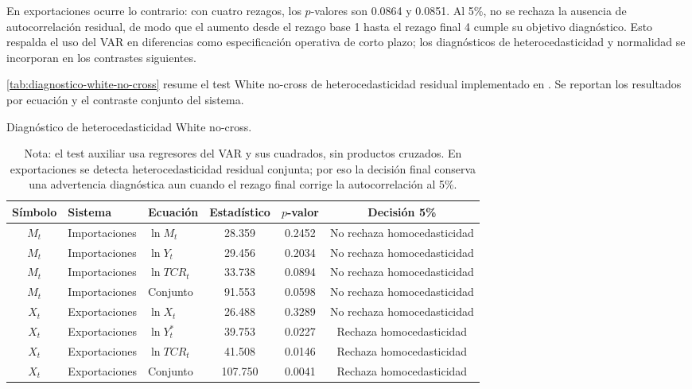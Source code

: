 \documentclass[11pt,a4paper]{article}
\begin{document}
	En exportaciones ocurre lo contrario: con cuatro rezagos, los \(p\)-valores
	son 0.0864 y 0.0851. Al 5\%, no se rechaza la ausencia de autocorrelación
	residual, de modo que el aumento desde el rezago base 1 hasta el rezago final 4
	cumple su objetivo diagnóstico. Esto respalda el uso del VAR en diferencias
	como especificación operativa de corto plazo; los diagnósticos de
	heterocedasticidad y normalidad se incorporan en los contrastes siguientes.

	\autoref{tab:diagnostico-white-no-cross} resume el test White no-cross de
	heterocedasticidad residual implementado en .
	Se reportan los resultados por ecuación y el contraste conjunto del sistema.

	\begin{table}[H]
		\centering
		\caption{Diagnóstico de heterocedasticidad White no-cross.}
		\label{tab:diagnostico-white-no-cross}
		\scriptsize
		\begin{tabular}{cllccc}
			\toprule
			Símbolo & Sistema & Ecuación & Estadístico & \(p\)-valor & Decisión 5\% \\
			\midrule
			\(M_t\) & Importaciones & \(\ln M_t\) & 28.359 & 0.2452 & No rechaza homocedasticidad \\
			\(M_t\) & Importaciones & \(\ln Y_t\) & 29.456 & 0.2034 & No rechaza homocedasticidad \\
			\(M_t\) & Importaciones & \(\ln TCR_t\) & 33.738 & 0.0894 & No rechaza homocedasticidad \\
			\(M_t\) & Importaciones & Conjunto & 91.553 & 0.0598 & No rechaza homocedasticidad \\
			\(X_t\) & Exportaciones & \(\ln X_t\) & 26.488 & 0.3289 & No rechaza homocedasticidad \\
			\(X_t\) & Exportaciones & \(\ln Y_t^*\) & 39.753 & 0.0227 & Rechaza homocedasticidad \\
			\(X_t\) & Exportaciones & \(\ln TCR_t\) & 41.508 & 0.0146 & Rechaza homocedasticidad \\
			\(X_t\) & Exportaciones & Conjunto & 107.750 & 0.0041 & Rechaza homocedasticidad \\
			\bottomrule
		\end{tabular}
		\caption*{\footnotesize Nota: el test auxiliar usa regresores del VAR y sus
			cuadrados, sin productos cruzados. En exportaciones se detecta
			heterocedasticidad residual conjunta; por eso la decisión final conserva una
			advertencia diagnóstica aun cuando el rezago final corrige la autocorrelación al
			5\%.}
	\end{table}
\end{document}
